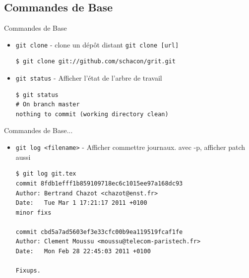 \documentclass{beamer}
\begin{document}
\subsection*{Commandes de Base}
\begin{frame}[containsverbatim]{Commandes de Base}
  \begin{itemize}
  \item \lstinline|git clone| - clone un dépôt distant \lstinline|git clone [url]| 
\begin{lstlisting}
$ git clone git://github.com/schacon/grit.git
\end{lstlisting}
  \item \lstinline|git status| - Afficher l'état de l'arbre de travail
\begin{lstlisting}
$ git status
# On branch master
nothing to commit (working directory clean)
\end{lstlisting}
\end{itemize}
\end{frame}

\begin{frame}[containsverbatim]{Commandes de Base...}
  \begin{itemize}

\item \lstinline|git log <filename>| - Afficher commettre journaux. avec -p, afficher patch aussi 
\begin{lstlisting}
$ git log git.tex 
commit 8fdb1efff1b859109718ec6c1015ee97a168dc93 
Author: Bertrand Chazot <chazot@enst.fr> 
Date:   Tue Mar 1 17:21:17 2011 +0100 
minor fixs

commit cbd5a7ad5603ef3e33cfc00b9ea119519fcaf1fe 
Author: Clement Moussu <moussu@telecom-paristech.fr>
Date:   Mon Feb 28 22:45:03 2011 +0100

Fixups.
\end{lstlisting}
\end{itemize}
\end{frame}
\end{document}
